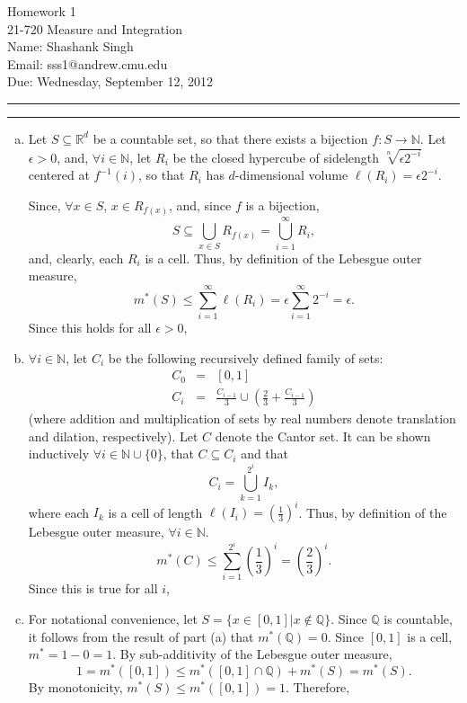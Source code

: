 \documentclass[11pt]{article}
\makeatletter
\newcounter{questionCounter}
\newcounter{partCounter}[questionCounter]
\newenvironment{question}[2][\arabic{questionCounter}]{%
    \setcounter{partCounter}{0}%
    \vspace{.25in} \hrule \vspace{0.5em}%
        \noindent{\bf #2}%
    \vspace{0.8em} \hrule \vspace{.10in}%
    \addtocounter{questionCounter}{1}%
}{}
\newcommand{\myname}{Shashank Singh}
\newcommand{\myandrew}{sss1@andrew.cmu.edu}
\newcommand{\myclass}{21-720 Measure and Integration}
\newcommand{\myhwnum}{1}
\newcommand{\duedate}{Wednesday, September 12, 2012}
\newcommand{\inv}{^{-1}}
\makeatother
\begin{document}
\thispagestyle{plain}

{\Large Homework \myhwnum} \\
\myclass \\
Name: \myname \\
Email: \myandrew \\
Due: \duedate \\
\begin{question}{Problem 1}
\begin{enumerate}[(a)]
\item Let $S \subseteq \mathbb{R}^d$ be a countable set, so that there exists
a bijection $f: S \rightarrow \mathbb{N}$. Let $\epsilon > 0$, and,
$\forall i \in \mathbb{N}$, let $R_i$ be the closed hypercube of sidelength
$\sqrt[n]{\epsilon2^{-i}}$ centered at $f\inv (i)$, so that $R_i$ has
$d$-dimensional volume $\ell(R_i) = \epsilon2^{-i}$.

Since,
$\forall x \in S$, $x \in R_{f(x)}$, and, since $f$ is a bijection,
\[S \subseteq \bigcup_{x \in S} R_{f(x)} = \bigcup_{i = 1}^{\infty} R_i,\]
and, clearly, each $R_i$ is a cell. Thus, by definition of the Lebesgue outer
measure,
\[m^*(S)
 \leq \sum_{i = 1}^{\infty} \ell(R_i)
 = \epsilon \sum_{i = 1}^{\infty} 2^{-i}
 = \epsilon.
\]
Since this holds for all $\epsilon > 0$, 

\item $\forall i \in \mathbb{N}$, let $C_i$ be the
following recursively defined family of sets:
\begin{eqnarray*}
C_0 & = & [0,1] \\
C_i
 & = & \frac{C_{i - 1}}{3} \cup \left(\frac23 + \frac{C_{i - 1}}{3}\right)
\end{eqnarray*}
(where addition and multiplication of sets by real numbers denote translation
and dilation, respectively).
Let $C$ denote the Cantor set. It can be shown inductively
$\forall i \in \mathbb{N}\cup\{0\}$, that $C \subseteq C_i$ and that
\[C_i = \bigcup_{k = 1}^{2^i} I_k,\]
where each $I_k$ is a cell of length $\ell(I_i) = \left(\frac13\right)^i$.
Thus, by definition of the Lebesgue outer measure, $\forall i \in \mathbb{N}$.
\[m^*(C)
 \leq \sum_{i = 1}^{2^i} \left(\frac13\right)^i
 = \left(\frac23\right)^i.
\]
Since this is true for all $i$, 

\item For notational convenience, let
$S = \{x \in [0,1] | x \not \in \mathbb{Q}\}$.
Since $\mathbb{Q}$ is countable, it follows from the result of part (a)
that $m^*(\mathbb{Q}) = 0$. Since $[0,1]$ is a cell, $m^* = 1 - 0 = 1$.
By sub-additivity of the Lebesgue outer measure,
\[1 = m^*([0,1]) \leq m^*([0,1] \cap \mathbb{Q}) + m^*(S) = m^*(S).\]
By monotonicity, $m^*(S) \leq m^*([0,1]) = 1$. Therefore, 
\end{enumerate}
\end{question}
\end{document}
